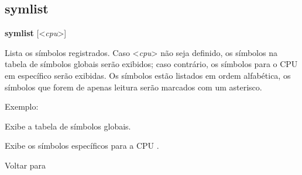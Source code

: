 \documentclass[letterpaper,10pt,brazil]{sphinxmanual}
\begin{document}
\subsection{symlist}
\label{debugger/general:symlist}\label{debugger/general:debugger-command-symlist}
\begin{DUlineblock}{0em}
\item[]
\begin{DUlineblock}{\DUlineblockindent}
\item[] \textbf{symlist} {[}\textless{}\emph{cpu}\textgreater{}{]}
\item[] 
\end{DUlineblock}
\item[] Lista os símbolos registrados. Caso \textless{}\emph{cpu}\textgreater{} não seja definido, os símbolos na tabela de símbolos globais serão exibidos; caso contrário, os símbolos para o CPU em específico serão exibidas. Os símbolos estão listados em ordem alfabética, os símbolos que forem de apenas leitura serão marcados com um asterisco.
\item[] 
\item[] Exemplo:
\item[] 
\item[]
\begin{DUlineblock}{\DUlineblockindent}
\item[] 
\item[] 
\end{DUlineblock}
\item[] Exibe a tabela de símbolos globais.
\item[] Exibe os símbolos específicos para a CPU .
\item[] 
\item[] Voltar para {\hyperref[debugger/general:debugger\string-general\string-list]{}}
\end{DUlineblock}
\begin{quote}
\label{debugger/general:debugger-command-softreset}\end{quote}
\end{document}
